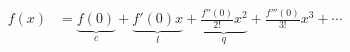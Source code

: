 \documentclass[preview]{standalone}
\begin{document}
\begin{align*}
f(x) &= \underbrace{f(0)}_{c} + \underbrace{f'(0)x}_{l} + \underbrace{\frac{f''(0)}{2!}x^2}_{q} + \frac{f'''(0)}{3!}x^3 + \cdots
\end{align*}
\end{document}

